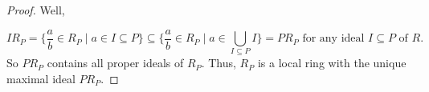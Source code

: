 \documentclass[addpoints,10pt]{exam}
\theoremstyle{plain}
\theoremstyle{definition}
\theoremstyle{plain}
\theoremstyle{plain}
\theoremstyle{definition}
\begin{document}
\begin{proof}
    Well, 
    
    $$IR_{P}=\{\frac{a}{b}\in R_{P}\mid a\in I\subseteq P\}\subseteq \{\frac{a}{b}\in R_{P}\mid a\in \bigcup_{I\subseteq P}I\}=PR_{P}\text{ for any ideal }I\subseteq P\text{ of $R$.}$$
    So $PR_{P}$ contains all proper ideals of $R_{P}$. Thus, $R_{P}$ is a local ring with the unique maximal ideal $PR_{P}$.

\end{proof}
\end{document}
